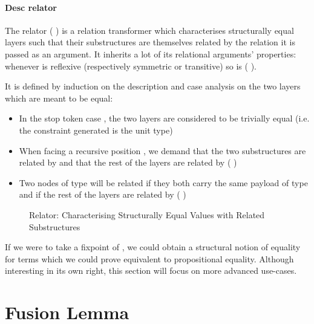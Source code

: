 \paragraph{Desc relator}
The relator (  ) is a relation transformer which characterises
structurally equal layers such that their substructures are themselves related
by the relation it is passed as an argument. It inherits a lot of its relational
arguments' properties: whenever  is reflexive (respectively symmetric or
transitive) so is {(   )}.\label{lem:zipstable}

It is defined by induction on the description and case analysis on the two
layers which are meant to be equal:
\begin{itemize}
  \item In the stop token case  , the two layers are considered to
    be trivially equal (i.e. the constraint generated is the unit type)
  \item When facing a recursive position { \AB{$\Delta$}  }, we
    demand that the two substructures are related by { \AB{$\Delta$} }
    and that the rest of the layers are related by (   )
  \item Two nodes of type {  } will
    be related if they both carry the same payload  of type  and if
    the rest of the layers are related by (    )
\end{itemize}

\begin{figure}[h]
\caption{Relator: Characterising Structurally Equal Values with Related Substructures\label{fig:zip-rel}}
\end{figure}

If we were to take a fixpoint of , we could obtain a structural
notion of equality for terms which we could prove equivalent to propositional
equality. Although interesting in its own right, this section will focus
on more advanced use-cases.




\section{Fusion Lemma}\label{section:fusion}

